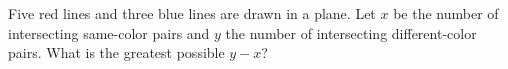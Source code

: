 Five red lines and three blue lines are drawn in a plane. Let $x$ be the number of intersecting same-color pairs and $y$ the number of intersecting different-color pairs. What is the greatest possible $y-x$?
